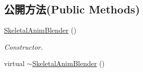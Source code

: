 \subsection*{公開方法(Public Methods)}
\begin{DoxyCompactItemize}
\item 
\hyperlink{class_magnum_1_1_skeletal_anim_blender_a07ed410db8d39ed10e1f9dbe56e2bb34}{Skeletal\+Anim\+Blender} ()\hypertarget{class_magnum_1_1_skeletal_anim_blender_a07ed410db8d39ed10e1f9dbe56e2bb34}{}\label{class_magnum_1_1_skeletal_anim_blender_a07ed410db8d39ed10e1f9dbe56e2bb34}

\begin{DoxyCompactList}\small\item\em Constructor. \end{DoxyCompactList}\item 
virtual \hyperlink{class_magnum_1_1_skeletal_anim_blender_af425a63f6e5022730bb5497e59d1b150}{$\sim$\+Skeletal\+Anim\+Blender} ()\hypertarget{class_magnum_1_1_skeletal_anim_blender_af425a63f6e5022730bb5497e59d1b150}{}\label{class_magnum_1_1_skeletal_anim_blender_af425a63f6e5022730bb5497e59d1b150}


\end{DoxyCompactItemize}
